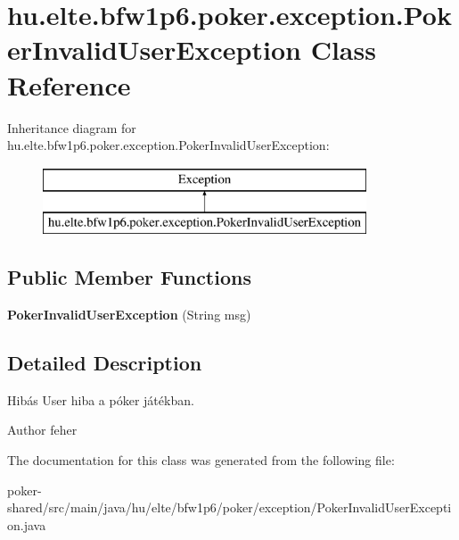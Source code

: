 \hypertarget{classhu_1_1elte_1_1bfw1p6_1_1poker_1_1exception_1_1_poker_invalid_user_exception}{}\section{hu.\+elte.\+bfw1p6.\+poker.\+exception.\+Poker\+Invalid\+User\+Exception Class Reference}
\label{classhu_1_1elte_1_1bfw1p6_1_1poker_1_1exception_1_1_poker_invalid_user_exception}
Inheritance diagram for hu.\+elte.\+bfw1p6.\+poker.\+exception.\+Poker\+Invalid\+User\+Exception\+:\begin{figure}[H]
\begin{center}
\leavevmode
\includegraphics[height=2.000000cm]{classhu_1_1elte_1_1bfw1p6_1_1poker_1_1exception_1_1_poker_invalid_user_exception}
\end{center}
\end{figure}
\subsection*{Public Member Functions}
\begin{DoxyCompactItemize}
\item 
\hypertarget{classhu_1_1elte_1_1bfw1p6_1_1poker_1_1exception_1_1_poker_invalid_user_exception_aad7825e5ed9d7c66af95840256e6b507}{}{\bfseries Poker\+Invalid\+User\+Exception} (String msg)\label{classhu_1_1elte_1_1bfw1p6_1_1poker_1_1exception_1_1_poker_invalid_user_exception_aad7825e5ed9d7c66af95840256e6b507}

\end{DoxyCompactItemize}


\subsection{Detailed Description}
Hibás User hiba a póker játékban. \begin{DoxyAuthor}{Author}
feher 
\end{DoxyAuthor}


The documentation for this class was generated from the following file\+:\begin{DoxyCompactItemize}
\item 
poker-\/shared/src/main/java/hu/elte/bfw1p6/poker/exception/Poker\+Invalid\+User\+Exception.\+java\end{DoxyCompactItemize}
